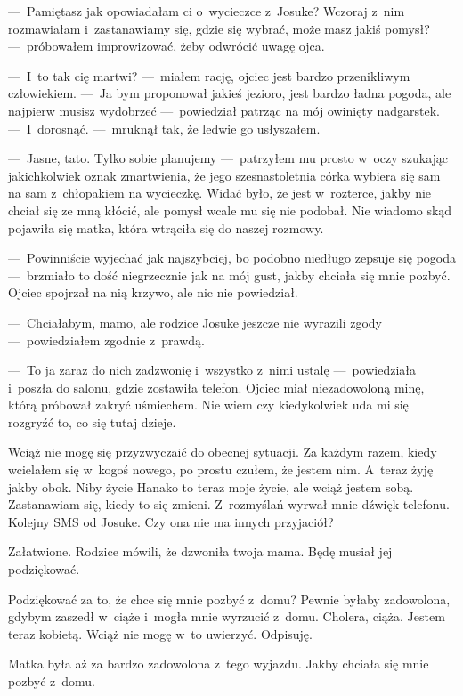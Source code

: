---~Pamiętasz jak opowiadałam ci o~wycieczce z~Josuke?  Wczoraj z~nim rozmawiałam i~zastanawiamy się, gdzie się wybrać, może masz jakiś pomysł? ---~próbowałem improwizować, żeby odwrócić uwagę ojca.

---~I~to tak cię martwi? ---~miałem rację, ojciec jest bardzo przenikliwym człowiekiem. ---~Ja bym proponował jakieś jezioro, jest bardzo ładna pogoda, ale najpierw musisz wydobrzeć ---~powiedział patrząc na mój owinięty nadgarstek. ---~I~dorosnąć. ---~mruknął tak, że ledwie go usłyszałem. 

---~Jasne, tato. Tylko sobie planujemy ---~patrzyłem mu prosto w~oczy szukając jakichkolwiek oznak zmartwienia, że jego szesnastoletnia córka wybiera się sam na sam z~chłopakiem na wycieczkę. Widać było, że jest w~rozterce, jakby nie chciał się ze mną kłócić, ale pomysł wcale mu się nie podobał. Nie wiadomo skąd pojawiła się matka, która wtrąciła się do naszej rozmowy.

---~Powinniście wyjechać jak najszybciej, bo podobno niedługo zepsuje się pogoda ---~brzmiało to dość niegrzecznie jak na mój gust, jakby chciała się mnie pozbyć. Ojciec spojrzał na nią krzywo, ale nic nie powiedział.

---~Chciałabym, mamo, ale rodzice Josuke jeszcze nie wyrazili zgody ---~powiedziałem zgodnie z~prawdą.

---~To ja zaraz do nich zadzwonię i~wszystko z~nimi ustalę ---~powiedziała i~poszła do salonu, gdzie zostawiła telefon.
Ojciec miał niezadowoloną minę, którą próbował zakryć uśmiechem. Nie wiem czy kiedykolwiek uda mi się rozgryźć to, co się tutaj dzieje. 

Wciąż nie mogę się przyzwyczaić do obecnej sytuacji. Za każdym razem, kiedy wcielałem się w~kogoś nowego, po prostu czułem, że jestem nim. A~teraz żyję jakby obok. Niby życie Hanako to teraz moje życie, ale wciąż jestem sobą. Zastanawiam się, kiedy to się zmieni. Z~rozmyślań wyrwał mnie dźwięk telefonu. Kolejny SMS od Josuke. Czy ona nie ma innych przyjaciół?

\begin{sms}
Załatwione. Rodzice mówili, że dzwoniła twoja mama. Będę musiał jej podziękować. 
\end{sms}

Podziękować za to, że chce się mnie pozbyć z~domu? Pewnie byłaby zadowolona, gdybym zaszedł w~ciąże i~mogła mnie wyrzucić z~domu. Cholera, ciąża. Jestem teraz kobietą. Wciąż nie mogę w~to uwierzyć. Odpisuję.

\begin{sms}
Matka była aż za bardzo zadowolona z~tego wyjazdu. Jakby chciała się mnie pozbyć z~domu.
\end{sms}

